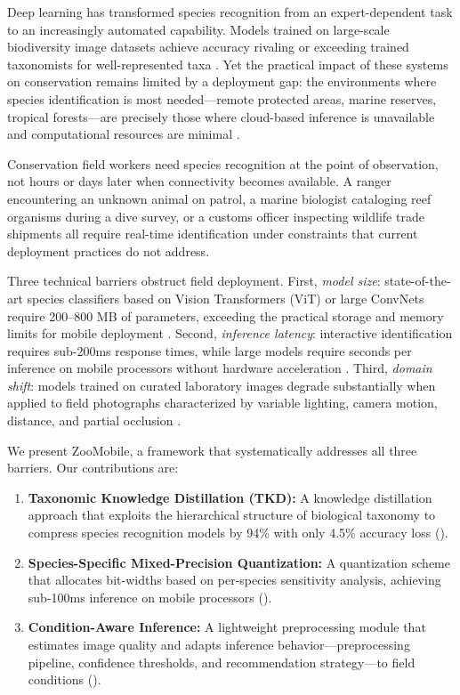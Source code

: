 \documentclass[11pt,a4paper]{article}
\begin{document}
Deep learning has transformed species recognition from an expert-dependent task to an increasingly automated capability.
Models trained on large-scale biodiversity image datasets achieve accuracy rivaling or exceeding trained taxonomists for well-represented taxa \citep{vanhorn2021benchmarking}.
Yet the practical impact of these systems on conservation remains limited by a deployment gap: the environments where species identification is most needed---remote protected areas, marine reserves, tropical forests---are precisely those where cloud-based inference is unavailable and computational resources are minimal \citep{tuia2022perspectives}.

Conservation field workers need species recognition at the point of observation, not hours or days later when connectivity becomes available.
A ranger encountering an unknown animal on patrol, a marine biologist cataloging reef organisms during a dive survey, or a customs officer inspecting wildlife trade shipments all require real-time identification under constraints that current deployment practices do not address.

Three technical barriers obstruct field deployment.
First, \emph{model size}: state-of-the-art species classifiers based on Vision Transformers (ViT) or large ConvNets require 200--800 MB of parameters, exceeding the practical storage and memory limits for mobile deployment \citep{dosovitskiy2021image}.
Second, \emph{inference latency}: interactive identification requires sub-200ms response times, while large models require seconds per inference on mobile processors without hardware acceleration \citep{howard2019searching}.
Third, \emph{domain shift}: models trained on curated laboratory images degrade substantially when applied to field photographs characterized by variable lighting, camera motion, distance, and partial occlusion \citep{beery2018recognition}.

We present ZooMobile, a framework that systematically addresses all three barriers.
Our contributions are:

\begin{enumerate}[leftmargin=*]
    \item \textbf{Taxonomic Knowledge Distillation (TKD):} A knowledge distillation approach that exploits the hierarchical structure of biological taxonomy to compress species recognition models by 94\% with only 4.5\% accuracy loss ().
    \item \textbf{Species-Specific Mixed-Precision Quantization:} A quantization scheme that allocates bit-widths based on per-species sensitivity analysis, achieving sub-100ms inference on mobile processors ().
    \item \textbf{Condition-Aware Inference:} A lightweight preprocessing module that estimates image quality and adapts inference behavior---preprocessing pipeline, confidence thresholds, and recommendation strategy---to field conditions ().
\end{enumerate}
\end{document}
